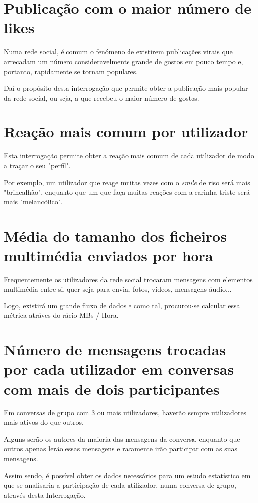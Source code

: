 \documentclass[12pt]{report}
\begin{document}
\section{Publicação com o maior número de likes}

Numa rede social, é comum o fenómeno de existirem publicações virais que arrecadam um número consideravelmente grande de gostos em pouco tempo e, portanto, rapidamente se tornam populares. \par

Daí o propósito desta interrogação que permite obter a publicação mais popular da rede social, ou seja, a que recebeu o maior número de gostos. 

\section{Reação mais comum por utilizador}

Esta interrogação permite obter a reação mais comum de cada utilizador de modo a traçar o seu "perfil". \par

Por exemplo, um utilizador que reage muitas vezes com o \textit{smile} de riso será mais "brincalhão", enquanto que um que faça muitas reações com a carinha triste será mais "melancólico".

\section{Média do tamanho dos ficheiros multimédia enviados por hora}

Frequentemente os utilizadores da rede social trocaram mensagens com elementos multimédia entre si, quer seja para enviar fotos, vídeos, mensagens áudio... \par

Logo, existirá um grande fluxo de dados e como tal, procurou-se calcular essa métrica atráves do rácio MBs / Hora.

\section{Número de mensagens trocadas por cada utilizador em conversas com mais de dois participantes}

Em conversas de grupo com 3 ou mais utilizadores, haverão sempre utilizadores mais ativos do que outros. \par

Alguns serão os autores da maioria das mensagens da conversa, enquanto que outros apenas lerão essas mensagens e raramente irão participar com as suas mensagens. \par
Assim sendo, é possível obter os dados necessários para um estudo estatístico em que se analisaria a participação de cada utilizador, numa conversa de grupo, através desta Interrogação.
\end{document}
